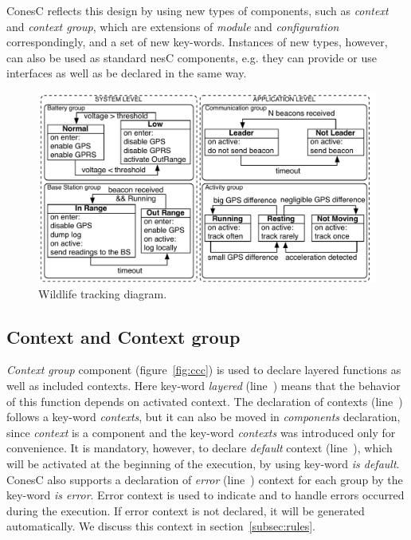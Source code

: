 ConesC reflects this design by using new types of components, such as
\emph{context} and \emph{context group}, which are extensions of \emph{module} and
\emph{configuration} correspondingly, and a set of new key-words.
Instances of new types, however, can also be used as standard nesC components,
e.g. they can provide or use interfaces as well as be declared in the same way.

\begin{figure}[!h]
\centering
\includegraphics[width=\columnwidth]{pdf/wildlifetracking}
\caption{Wildlife tracking diagram.}
\label{fig:wtd}
\end{figure}

\subsection{Context and Context group}\label{subsec:components}

\emph{Context group} component (figure~\ref{fig:ccc}) is used to declare layered functions as well
as included contexts. Here key-word \emph{layered} (line~)
means that the behavior of this function depends on activated context. The
declaration of contexts (line~) follows a key-word
\emph{contexts}, but it can also be moved in \emph{components} declaration,
since \emph{context} is a component and the key-word \emph{contexts} was introduced only for
convenience. It is mandatory, however, to declare \emph{default} context (line~),
which will be activated at the beginning of the execution, by using key-word \emph{is
default}. ConesC also supports a declaration of \emph{error}
(line~) context for each group by the key-word \emph{is error}.
Error context is used to indicate and to handle errors occurred during the execution. If
error context is not declared, it will be generated automatically. We discuss this context in
section~\ref{subsec:rules}.

